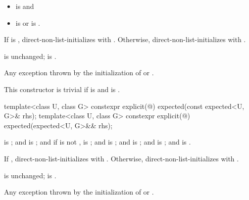 \begin{itemdescr}
\pnum
\constraints
\begin{itemize}
\item {} is  and
\item {} is  or  is .
\end{itemize}

\pnum
\effects
If  is , direct-non-list-initializes  with . Otherwise, direct-non-list-initializes  with .

\pnum
\ensures
{} is unchanged;  is .

\pnum
\throws
Any exception thrown by the initialization of  or .

\pnum
\remarks
This constructor is trivial if  is  and  is .
\end{itemdescr}

%
\begin{itemdecl}
template<class U, class G>
  constexpr explicit(@\seebelow@) expected(const expected<U, G>& rhs);
template<class U, class G>
  constexpr explicit(@\seebelow@) expected(expected<U, G>&& rhs);
\end{itemdecl}

\begin{itemdescr}
\pnum
\constraints
{} is ; and  is ; and if  is not \cv{} ,  is ; and  is ; and  is ; and  is ; and  is .

\pnum
\effects
If , direct-non-list-initializes  with . Otherwise, direct-non-list-initializes  with .

\pnum
\ensures
{} is unchanged;  is .

\pnum
\throws
Any exception thrown by the initialization of  or .
\end{itemdescr}

